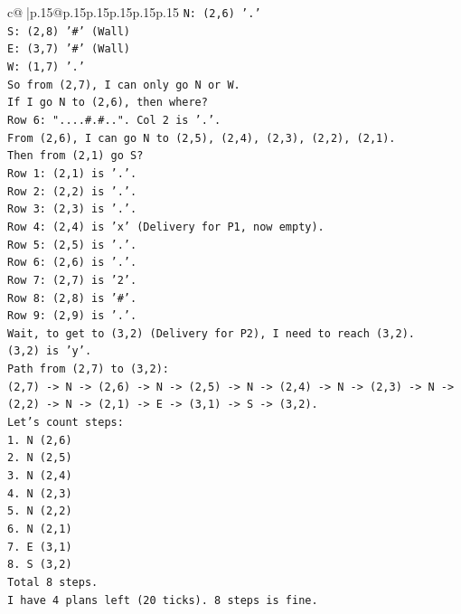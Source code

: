 \documentclass{article}
\begin{document}
{\begin{supertabular}{c@{$\;$}|p{.15\linewidth}@{}p{.15\linewidth}p{.15\linewidth}p{.15\linewidth}p{.15\linewidth}p{.15\linewidth}}
{{{\texttt{N: (2,6) '.'} \\
\texttt{S: (2,8) '\#' (Wall)} \\
\texttt{E: (3,7) '\#' (Wall)} \\
\texttt{W: (1,7) '.'} \\
\texttt{So from (2,7), I can only go N or W.} \\
\texttt{If I go N to (2,6), then where?} \\
\texttt{Row 6: "....\#.\#..". Col 2 is '.'.} \\
\texttt{From (2,6), I can go N to (2,5), (2,4), (2,3), (2,2), (2,1).} \\
\texttt{Then from (2,1) go S?} \\
\texttt{Row 1: (2,1) is '.'.} \\
\texttt{Row 2: (2,2) is '.'.} \\
\texttt{Row 3: (2,3) is '.'.} \\
\texttt{Row 4: (2,4) is 'x' (Delivery for P1, now empty).} \\
\texttt{Row 5: (2,5) is '.'.} \\
\texttt{Row 6: (2,6) is '.'.} \\
\texttt{Row 7: (2,7) is '2'.} \\
\texttt{Row 8: (2,8) is '\#'.} \\
\texttt{Row 9: (2,9) is '.'.} \\
\texttt{Wait, to get to (3,2) (Delivery for P2), I need to reach (3,2).} \\
\texttt{(3,2) is 'y'.} \\
\texttt{Path from (2,7) to (3,2):} \\
\texttt{(2,7) {-}> N {-}> (2,6) {-}> N {-}> (2,5) {-}> N {-}> (2,4) {-}> N {-}> (2,3) {-}> N {-}> (2,2) {-}> N {-}> (2,1) {-}> E {-}> (3,1) {-}> S {-}> (3,2).} \\
\texttt{Let's count steps:} \\
\texttt{1. N (2,6)} \\
\texttt{2. N (2,5)} \\
\texttt{3. N (2,4)} \\
\texttt{4. N (2,3)} \\
\texttt{5. N (2,2)} \\
\texttt{6. N (2,1)} \\
\texttt{7. E (3,1)} \\
\texttt{8. S (3,2)} \\
\texttt{Total 8 steps.} \\
\texttt{I have 4 plans left (20 ticks). 8 steps is fine.} \\
}}}
\end{supertabular}}
\end{document}
